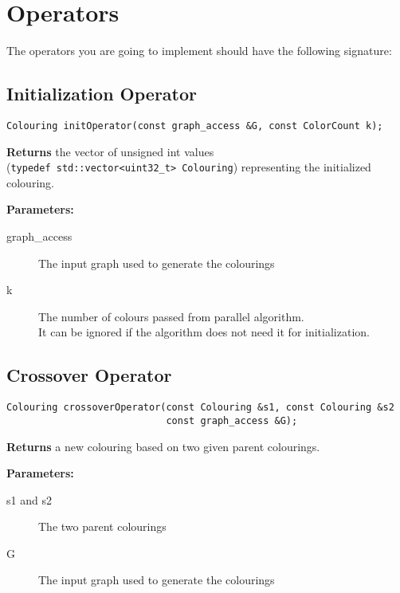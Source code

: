 \documentclass{scrartcl}
\begin{document}
\section{Operators}

The operators you are going to implement should have the following signature:

\subsection{Initialization Operator}

\renewcommand{\theFancyVerbLine}{\sffamily \textcolor[rgb]{0.5,0.5,1.0}{\normalsize \oldstylenums{\arabic{FancyVerbLine}}}}

\begin{verbatim}
Colouring initOperator(const graph_access &G, const ColorCount k);
\end{verbatim}

\textbf{Returns} the vector of unsigned int values \\ (\texttt{typedef std::vector<uint32_t> Colouring}) representing the initialized colouring.

\textbf{Parameters:}
\begin{description}
	\item[graph\_access] The input graph used to generate the colourings
	\item[k] The number of colours passed from parallel algorithm. \\
	It can be ignored if the algorithm does not need it for initialization.
\end{description}

\subsection{Crossover Operator}

\begin{verbatim}
Colouring crossoverOperator(const Colouring &s1, const Colouring &s2
                            const graph_access &G);
\end{verbatim}

\textbf{Returns} a new colouring based on two given parent colourings.

\textbf{Parameters:}
\begin{description}
	\item[s1 and s2] The two parent colourings
	\item[G] The input graph used to generate the colourings
\end{description}
\end{document}
